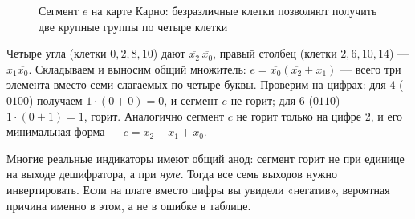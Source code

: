 \begin{figure}[H]
\centering
{}
\caption{Сегмент $e$ на карте Карно: безразличные клетки позволяют получить две крупные группы по четыре клетки}
\label{fig:seg_e}
\end{figure}

Четыре угла (клетки $0,2,8,10$) дают $\overline{x_2}\,\overline{x_0}$,
правый столбец (клетки $2,6,10,14$) --- $x_1\overline{x_0}$. Складываем и
выносим общий множитель: $e=\overline{x_0}(\overline{x_2}+x_1)$ --- всего три
элемента вместо семи слагаемых по четыре буквы. Проверим на цифрах:
для $4$ ($0100$) получаем $1\cdot(0+0)=0$, и сегмент $e$ не горит; для $6$
($0110$) --- $1\cdot(0+1)=1$, горит. Аналогично сегмент $c$ не горит только
на цифре 2, и его минимальная форма --- $c=x_2+\overline{x_1}+x_0$.

\begin{warnbox}
Многие реальные индикаторы имеют общий анод: сегмент горит не при единице
на выходе дешифратора, а при \emph{нуле}. Тогда все семь выходов нужно
инвертировать. Если на плате вместо цифры вы увидели «негатив», вероятная
причина именно в этом, а не в ошибке в таблице.
\end{warnbox}

